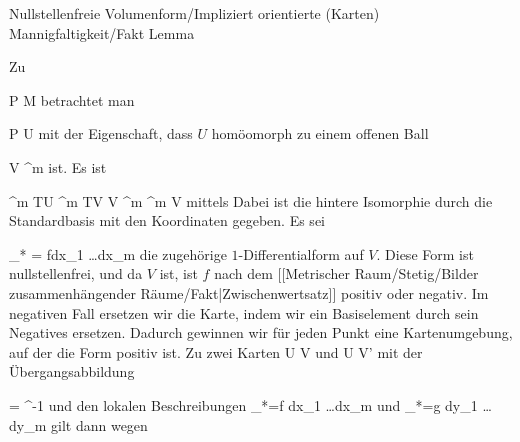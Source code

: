 {Nullstellenfreie Volumenform/Impliziert orientierte (Karten) Mannigfaltigkeit/Fakt}
{Lemma}
{}
{

\faktzusatz {}

}
{

Zu

\mavergleichskette
{\vergleichskette
{ P
}
{ \in }{ M
}
{  }{
}
{    }{
}
{   }{
}
}
{}{}{}
betrachtet man

\mavergleichskette
{\vergleichskette
{ P
}
{ \in }{ U
}
{  }{
}
{    }{
}
{   }{
}
}
{}{}{}
mit der Eigenschaft, dass $U$ homöomorph zu einem offenen Ball

\mavergleichskette
{\vergleichskette
{ V
}
{ \subseteq }{ \R^m
}
{  }{
}
{    }{
}
{   }{
}
}
{}{}{}
ist. Es ist

\mavergleichskettedisp
{\vergleichskette
{ \bigwedge^m TU
}
{ \cong} { \bigwedge^m TV
}
{ \cong} { V \times \bigwedge^m \R^m
}
{ \cong} { V \times \R
}
{ } {
}
}
{}{}{}
mittels
 Dabei ist die hintere Isomorphie durch die Standardbasis mit den Koordinaten
 gegeben. Es sei

\mavergleichskette
{\vergleichskette
{ \alpha_* \omega
}
{ = }{ fdx_1 \wedge \ldots \wedge dx_m
}
{  }{
}
{    }{
}
{   }{
}
}
{}{}{}
die zugehörige $1$-Differentialform auf $V$. Diese Form ist nullstellenfrei, und da $V$
ist, ist $f$ nach dem
[[Metrischer Raum/Stetig/Bilder zusammenhängender Räume/Fakt|Zwischenwertsatz]]
positiv oder negativ. Im negativen Fall ersetzen wir die Karte, indem wir ein Basiselement durch sein Negatives ersetzen. Dadurch gewinnen wir für jeden Punkt eine Kartenumgebung, auf der die Form positiv ist. Zu zwei Karten
\maabb {\alpha} { U } { V
} {}
und
\maabb {\beta} { U } { V'
} {}
mit der Übergangsabbildung

\mavergleichskette
{\vergleichskette
{ \psi
}
{ = }{ \beta \circ \alpha^{-1}
}
{  }{
}
{    }{
}
{   }{
}
}
{}{}{}
und den lokalen Beschreibungen
\mathkor {} {\alpha_*\omega =f dx_1 \wedge \ldots \wedge dx_m} {und} {\beta_*\omega =g dy_1 \wedge \ldots \wedge dy_m} {}
gilt dann wegen

}
